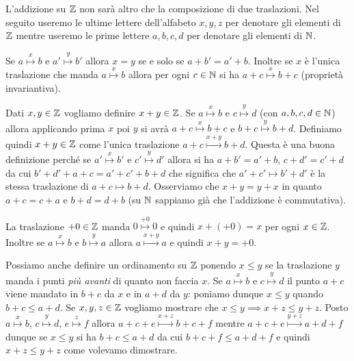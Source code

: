 L'addizione su ${\mathbb Z}$ non sarà altro che la composizione 
di due traslazioni.
Nel seguito useremo le ultime lettere dell'alfabeto 
$x,y,z$ per denotare gli elementi di ${\mathbb Z}$ mentre 
useremo le prime lettere $a,b,c,d$ per denotare 
gli elementi di ${\mathbb N}$.

Se $a\stackrel x \mapsto b$ e $a'\stackrel y \mapsto b'$
allora $x=y$ se e solo se $a+b'=a'+b$.
Inoltre se $x$ è l'unica traslazione che manda $a\stackrel x \mapsto b$ 
allora per ogni $c\in {\mathbb N}$ si ha $a+c\stackrel x \mapsto b+c$
(proprietà invariantiva).

Dati $x,y\in {\mathbb Z}$ vogliamo definire $x+y\in {\mathbb Z}$.
Se $a\stackrel x\mapsto b$
e $c\stackrel y\mapsto d$ 
(con $a,b,c,d\in {\mathbb N}$)
allora applicando prima $x$ poi $y$ 
si avrà $a+c\stackrel x\mapsto b+c$ 
e $b+c\stackrel y\mapsto b+d$. 
Definiamo quindi $x+y\in {\mathbb Z}$ come l'unica traslazione 
$a+c \stackrel{x+y} \mapsto b+d$.
Questa è una buona definizione perché se $a'\stackrel x \mapsto b'$ 
e $c'\stackrel y \mapsto d'$ allora 
si ha $a+b'=a'+b$, $c+d'=c'+d$ 
da cui 
$b'+d' + a+c = a'+c' + b+d$ 
che significa che $a'+c'\mapsto b'+d'$ 
è la stessa traslazione di $a+c\mapsto b+d$.
Osserviamo che $x+y=y+x$ in quanto $a+c=c+a$ e $b+d=d+b$
(su ${\mathbb N}$ sappiamo già che l'addizione è commutativa).

La traslazione $+0\in {\mathbb Z}$ manda $0\stackrel{+0}\mapsto 0$ 
e quindi $x+(+0)=x$ per ogni $x\in {\mathbb Z}$.
Inoltre se $a\stackrel x\mapsto b$ e $b\stackrel y \mapsto a$ 
allora $a \stackrel{x+y} \mapsto a$ e quindi $x+y = +0$.

Possiamo anche definire un ordinamento su ${\mathbb Z}$ ponendo $x\le y$ 
se la traslazione $y$ manda i punti \emph{più avanti} di quanto 
non faccia $x$. 
Se $a\stackrel x\mapsto b$ e $c\stackrel y\mapsto d$ 
il punto $a+c$ viene mandato in $b+c$ da $x$ e in $a+d$ da $y$:
poniamo dunque $x\le y$ quando $b+c\le a+d$.
Se $x,y,z\in {\mathbb Z}$ vogliamo mostrare 
che $x\le y \implies x+z\le y+z$.
Posto $a\stackrel x\mapsto b$, $c\stackrel y\mapsto d$, 
$e\stackrel z\mapsto f$ 
allora $a+c+e \stackrel{x+z} \mapsto b + c+f$ 
mentre $a+c+e \stackrel{y+z} \mapsto a+d+f$ dunque 
se $x\le y$ si ha $b+c \le a+d$ da cui $b+c+f \le a+d+f$
e quindi $x+z \le y+z$ come volevamo dimostrare.

